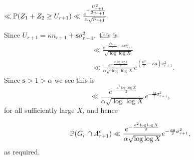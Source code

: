 \documentclass[12pt]{amsart}
\def\P{\ensuremath\mathbb{P}}
\numberwithin{equation}{section}
\numberwithin{thm}{section}
\newcommand{\1}{\mathbf 1}
\begin{document}
$\ll \P(Z_1+Z_2\ge U_{r+1})\ll \frac{ e^{-\frac{U_{r+1}^2}{2n_{r+1}}}}{\alpha\sqrt{ n_{r+1}}}.$ 

Since $U_{r+1}=\kappa n_{r+1}+\mathbf{s}\sigma^2_{r+1},$ this is
\begin{align}
	\nonumber&\ll \frac{e^{-\frac{\kappa^2 n_{r+1}}{2}-\kappa \mathbf{s} \sigma^2_{r+1}}}{\sqrt{\log\log X}}  \\
	&\ll \frac{e^{-\frac{\kappa^2 \log\log X}{2}}}{\alpha\sqrt{\log\log X}} e^{(\frac{\kappa^2}{2}-\kappa \mathbf{s})\sigma^2_{r+1}}. 
\end{align}
Since $\mathbf{s}>1>\alpha$ we see this is 
\begin{equation}\label{bound4}\ll \frac{e^{-\frac{\kappa^2 \log\log X}{2}}}{\alpha\sqrt{\log\log X}} e^{-\frac{\kappa\mathbf{s}}{2}\sigma^2_{r+1}},\end{equation}
for all sufficiently large $X$, and hence 

\begin{equation}\label{PnotA}
	\P(G_{r}\cap A_{r+1}^c)\ll   \frac{e^{-\frac{\kappa^2 \log\log X}{2}}}{\alpha\sqrt{\log\log X}} e^{-\frac{\kappa\mathbf{s}}{2}\sigma^2_{r+1}}, 
\end{equation}
as required.
\end{document}
